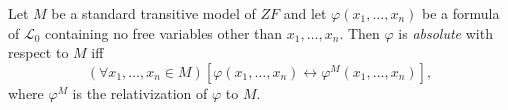 Let $M$ be a standard transitive model of $ZF$ and let $\varphi(x_1, \ldots, x_n)$ be a formula of $\mathcal{L}_0$ containing no free variables other than $x_1, \ldots, x_n$. Then $\varphi$ is \textit{absolute} with respect to $M$ iff
$$(\forall x_1, \ldots, x_n \in M)[\varphi(x_1, \ldots, x_n) \leftrightarrow \varphi^M(x_1, \ldots, x_n)],$$
where $\varphi^M$ is the relativization of $\varphi$ to $M$.
